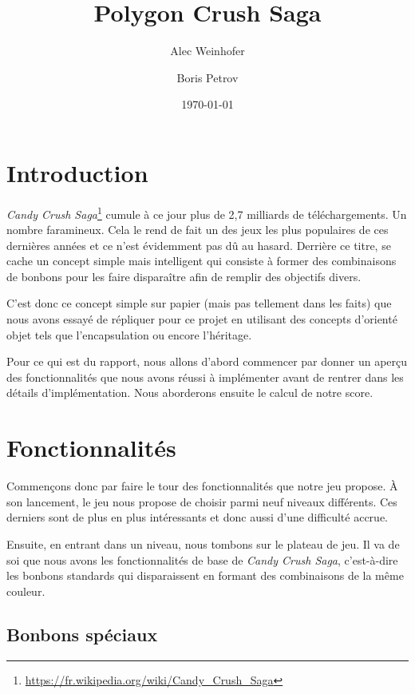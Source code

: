 \documentclass[11pt,a4paper]{article}
\title{Polygon Crush Saga}
\author{Alec Weinhofer \and Boris Petrov}
\date{\today}
\begin{document}
\maketitle
\tableofcontents


\section{Introduction}

\emph{Candy Crush Saga}\footnote{\url{https://fr.wikipedia.org/wiki/Candy_Crush_Saga}}
cumule à ce jour plus de 2,7 milliards de
téléchargements. Un nombre faramineux. Cela le rend de fait
un des jeux les plus populaires de ces dernières années et
ce n'est évidemment pas dû au hasard. Derrière ce titre, se
cache un concept simple mais intelligent qui consiste à
former des combinaisons de bonbons pour les faire
disparaître afin de remplir des objectifs divers.

C'est donc ce concept simple sur papier (mais pas tellement
dans les faits) que nous avons essayé de répliquer pour ce
projet en utilisant des concepts d'orienté objet tels que
l'encapsulation ou encore l'héritage.

Pour ce qui est du rapport, nous allons d'abord commencer par donner un aperçu des
fonctionnalités que nous avons réussi à implémenter avant de
rentrer dans les détails d'implémentation.
Nous aborderons ensuite le calcul de notre score.

\section{Fonctionnalités}

Commençons donc par faire le tour des fonctionnalités que notre jeu propose.
À son lancement, le jeu nous propose de choisir parmi neuf niveaux différents.
Ces derniers sont de plus en plus intéressants et donc
aussi d'une difficulté accrue.

Ensuite, en entrant dans un niveau, nous tombons sur le plateau de jeu.
Il va de soi que nous avons les fonctionnalités de base de \emph{Candy Crush Saga},
c'est-à-dire les bonbons standards qui disparaissent en
formant des combinaisons de la même couleur.

\subsection{Bonbons spéciaux}
\end{document}
